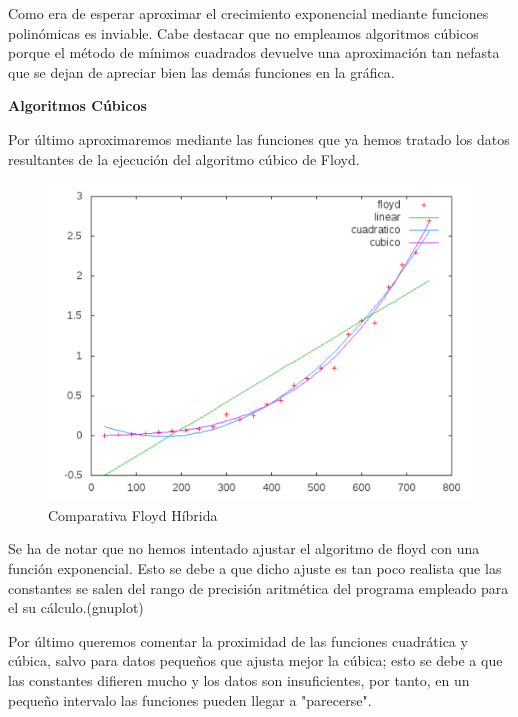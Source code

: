 \documentclass[a4paper, 11pt]{article}
\begin{document}
Como era de esperar aproximar el crecimiento exponencial mediante funciones polinómicas es inviable. Cabe destacar que no empleamos algoritmos cúbicos porque el método de mínimos cuadrados devuelve una aproximación tan nefasta que se dejan de apreciar bien las demás funciones en la gráfica.

\vspace{1cm}

\textbf{Algoritmos Cúbicos}

Por último aproximaremos mediante las funciones que ya hemos tratado los datos resultantes de la ejecución del algoritmo cúbico de Floyd.

\begin{figure}[h]\includegraphics[width=13cm]{img/floyd_hibrida.pdf} \centering
	\caption{Comparativa Floyd Híbrida}\end{figure}

\begin{framed}
	Se ha de notar que no hemos intentado ajustar el algoritmo de floyd con una función exponencial. Esto se debe a que dicho ajuste es tan poco realista que las constantes se salen del rango de precisión aritmética del programa empleado para el su cálculo.(gnuplot)
\end{framed}


Por último queremos comentar la proximidad de las funciones cuadrática y cúbica, salvo para datos pequeños que ajusta mejor la cúbica; esto se debe a que las constantes difieren mucho y los datos son insuficientes, por tanto, en un pequeño intervalo las funciones pueden llegar a "parecerse".
\end{document}
